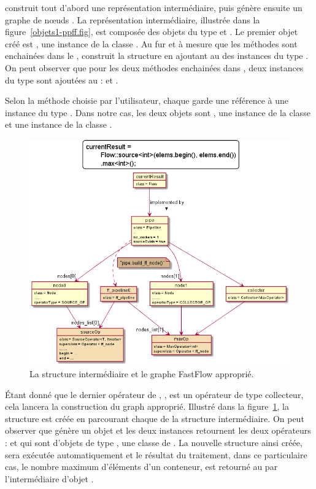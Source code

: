  construit tout d'abord une repr\'esentation interm\'ediaire, puis g\'en\`ere ensuite un graphe de n\oe{}uds . La repr\'esentation interm\'ediaire, illustr\'ee dans la figure~\ref{objets1-ppff.fig}, est compos\'ee des objets du type  et . Le premier objet cr\'e\'e est , une instance de la classe . Au fur et \`a mesure que les m\'ethodes sont enchain\'ees dans le ,  construit la structure en ajoutant au  des instances du type . On peut observer que pour les deux m\'ethodes enchain\'ees dans , deux instances du type  sont ajout\'ees au  :  et . 

Selon la m\'ethode choisie par l'utilisateur, chaque  garde une r\'ef\'erence \`a une instance du type . Dans notre cas, les deux objets  sont , une instance de la classe  et  une instance de la classe . 


\begin{figure}
\centering
         \includegraphics[width=1.0\textwidth]{Figures/objets1-ff.png}
      \caption{La structure interm\'ediaire  et le graphe FastFlow appropri\'e.}
       \label{objets1-ff.fig}
\end{figure}
 
\'Etant donn\'e que le dernier op\'erateur de , , est un op\'erateur de type collecteur, cela lancera la construction du graph  appropri\'e. Illustr\'e dans la figure~\ref{objets1-ff.fig}, la structure  est cr\'e\'ee en parcourant chaque  de la structure interm\'ediaire. On peut observer que  g\'en\`ere un objet  et les deux instances  retournent les deux op\'erateurs :  et  qui sont d'objets de type , une classe de . La nouvelle structure ainsi cr\'e\'ee, sera ex\'ecut\'ee automatiquement et le r\'esultat du traitement, dans ce particulaire cas, le nombre maximum d'\'el\'ements d'un conteneur, est retourn\'e au  par l'interm\'ediaire d'objet . 

